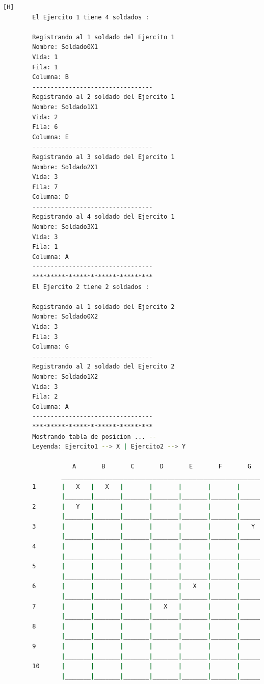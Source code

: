 \documentclass{article}
\begin{document}
	\begin{lstlisting}[language=bash,caption={La ejecución: \textcolor{red}{PARA PODER VER LA TABLA COMPLETAMENTE MIRAR LA PLANTILLA DE LATEX O EJECUTARLO: }}][H]
		El Ejercito 1 tiene 4 soldados : 

		Registrando al 1 soldado del Ejercito 1
		Nombre: Soldado0X1
		Vida: 1
		Fila: 1
		Columna: B
		---------------------------------
		Registrando al 2 soldado del Ejercito 1
		Nombre: Soldado1X1
		Vida: 2
		Fila: 6
		Columna: E
		---------------------------------
		Registrando al 3 soldado del Ejercito 1
		Nombre: Soldado2X1
		Vida: 3
		Fila: 7
		Columna: D
		---------------------------------
		Registrando al 4 soldado del Ejercito 1
		Nombre: Soldado3X1
		Vida: 3
		Fila: 1
		Columna: A
		---------------------------------
		*********************************
		El Ejercito 2 tiene 2 soldados : 
		
		Registrando al 1 soldado del Ejercito 2
		Nombre: Soldado0X2
		Vida: 3
		Fila: 3
		Columna: G
		---------------------------------
		Registrando al 2 soldado del Ejercito 2
		Nombre: Soldado1X2
		Vida: 3
		Fila: 2
		Columna: A
		---------------------------------
		*********************************
		Mostrando tabla de posicion ... --
		Leyenda: Ejercito1 --> X | Ejercito2 --> Y
		
				   A       B       C       D       E       F       G       H       I       J
				_________________________________________________________________________________
		1       |   X   |   X   |       |       |       |       |       |       |       |       |
				|_______|_______|_______|_______|_______|_______|_______|_______|_______|_______|
		2       |   Y   |       |       |       |       |       |       |       |       |       |
				|_______|_______|_______|_______|_______|_______|_______|_______|_______|_______|
		3       |       |       |       |       |       |       |   Y   |       |       |       |
				|_______|_______|_______|_______|_______|_______|_______|_______|_______|_______|
		4       |       |       |       |       |       |       |       |       |       |       |
				|_______|_______|_______|_______|_______|_______|_______|_______|_______|_______|
		5       |       |       |       |       |       |       |       |       |       |       |
				|_______|_______|_______|_______|_______|_______|_______|_______|_______|_______|
		6       |       |       |       |       |   X   |       |       |       |       |       |
				|_______|_______|_______|_______|_______|_______|_______|_______|_______|_______|
		7       |       |       |       |   X   |       |       |       |       |       |       |
				|_______|_______|_______|_______|_______|_______|_______|_______|_______|_______|
		8       |       |       |       |       |       |       |       |       |       |       |
				|_______|_______|_______|_______|_______|_______|_______|_______|_______|_______|
		9       |       |       |       |       |       |       |       |       |       |       |
				|_______|_______|_______|_______|_______|_______|_______|_______|_______|_______|
		10      |       |       |       |       |       |       |       |       |       |       |
				|_______|_______|_______|_______|_______|_______|_______|_______|_______|_______|
		

\end{lstlisting}
\end{document}
